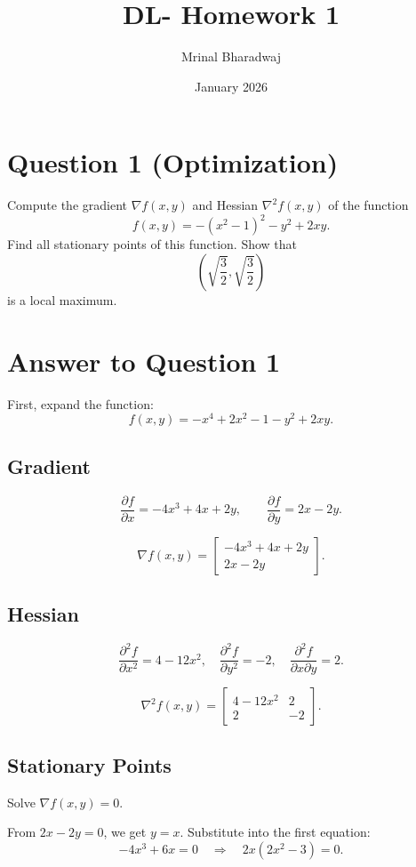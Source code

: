 \documentclass{article}
\title{DL- Homework 1}
\author{Mrinal Bharadwaj}
\date{January 2026}
\begin{document}
\maketitle


\section*{Question 1 (Optimization)}

Compute the gradient $\nabla f(x,y)$ and Hessian $\nabla^2 f(x,y)$ of the function
\[
f(x,y)=-(x^2-1)^2-y^2+2xy.
\]
Find all stationary points of this function. Show that
\[
\left(\sqrt{\frac{3}{2}},\sqrt{\frac{3}{2}}\right)
\]
is a local maximum.

\section*{Answer to Question 1}

First, expand the function:
\[
f(x,y)=-x^4+2x^2-1-y^2+2xy.
\]

\subsection*{Gradient}
\[
\frac{\partial f}{\partial x}=-4x^3+4x+2y,
\qquad
\frac{\partial f}{\partial y}=2x-2y.
\]

\[
\nabla f(x,y)=
\begin{bmatrix}
-4x^3+4x+2y\\
2x-2y
\end{bmatrix}.
\]

\subsection*{Hessian}
\[
\frac{\partial^2 f}{\partial x^2}=4-12x^2,
\quad
\frac{\partial^2 f}{\partial y^2}=-2,
\quad
\frac{\partial^2 f}{\partial x\partial y}=2.
\]

\[
\nabla^2 f(x,y)=
\begin{bmatrix}
4-12x^2 & 2\\
2 & -2
\end{bmatrix}.
\]

\subsection*{Stationary Points}

Solve $\nabla f(x,y)=0$.

From $2x-2y=0$, we get $y=x$.
Substitute into the first equation:
\[
-4x^3+6x=0
\quad\Rightarrow\quad
2x(2x^2-3)=0.
\]
\end{document}
